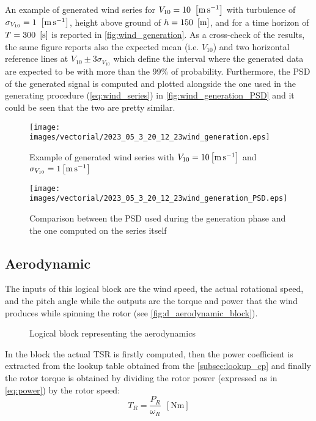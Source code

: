 An example of generated wind series for $V_{10}=10 \ \left[\si{\meter\per\second}\right]$ with turbulence of $\sigma_{V_{10}}=1 \ \mesunt{\meter\per\second}$, height above ground of $h=150 
 \ \left[\si{\meter}\right]$, and for a time horizon of $T = 300 \ \left[\si{\second}\right]$ is reported in \autoref{fig:wind_generation}. As a cross-check of the results, the same figure reports also the expected mean (i.e. $V_{10}$) and two horizontal reference lines at $V_{10}\pm3\sigma_{V_{10}}$ which define the interval where the generated data are expected to be with more than the 99\% of probability. Furthermore, the PSD of the generated signal is computed and plotted alongside the one used in the generating procedure (\autoref{eq:wind_series}) in \autoref{fig:wind_generation_PSD} and it could be seen that the two are pretty similar. 
\begin{figure}[htb]
    \centering
    \texttt{[image: images/vectorial/2023\_05\_3\_20\_12\_23wind\_generation.eps]}
    \caption{Example of generated wind series with $V_{10}=10\left[\si{\meter\per\second}\right]$ and $\sigma_{V_{10}}=1\left[\si{\meter\per\second}\right]$ }
    \label{fig:wind_generation}
\end{figure}

\begin{figure}[htb]
    \centering
    \texttt{[image: images/vectorial/2023\_05\_3\_20\_12\_23wind\_generation\_PSD.eps]}
    \caption{Comparison between the PSD used during the generation phase and the one computed on the series itself}
    \label{fig:wind_generation_PSD}
\end{figure}

\subsection{Aerodynamic}
The inputs of this logical block are the wind speed, the actual rotational speed, and the pitch angle while the outputs are the torque and power that the wind produces while spinning the rotor (see \autoref{fig:d_aerodynamic_block}). 
\begin{figure}
  \centering
  
  \caption{Logical block representing the aerodynamics}
  \label{fig:d_aerodynamic_block}
\end{figure}

In the block the actual \acrshort{TSR} is firstly computed, then the power coefficient is extracted from the lookup table obtained from the \autoref{subsec:lookup_cp} and finally the rotor torque is obtained by dividing the rotor power (expressed as in \autoref{eq:power}) by the rotor speed:
\begin{equation}
    T_R = \frac{P_R}{\omega_R} \ \ \left[\si{\newton\meter}\right]
\end{equation}

